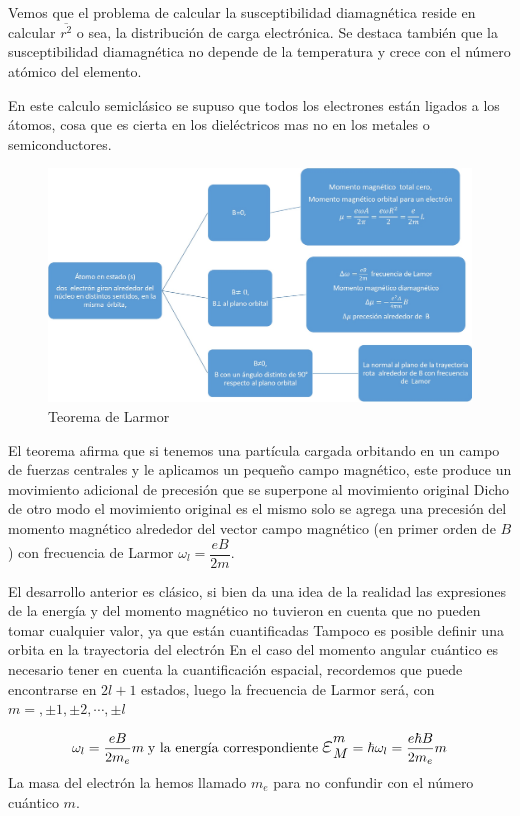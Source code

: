 Vemos que el problema de calcular la susceptibilidad diamagnética reside en calcular $\overline{r^{2}}$ o sea, la distribución de carga electrónica. Se destaca también que la susceptibilidad diamagnética no depende de la temperatura y crece con el número atómico del elemento.

En este calculo semiclásico se supuso que todos los electrones están ligados a los átomos, cosa que es cierta en los dieléctricos mas no en los metales o semiconductores.

\begin{figure}[H]
    \centering
    \includegraphics[width=1.0\textwidth]{./Figures/fig_s11}
	\caption{Teorema de Larmor}
	\label{fig:s11}
\end{figure}

El teorema afirma que si tenemos una partícula cargada orbitando en un campo de fuerzas centrales y le aplicamos un pequeño campo magnético, este produce un movimiento adicional de precesión que se superpone al movimiento original Dicho de otro modo el movimiento original es el mismo solo se agrega una precesión del momento magnético alrededor del vector campo magnético (en primer orden de $B$) con frecuencia de Larmor $\omega_{l}=\dfrac{eB}{2m}$.

El desarrollo anterior es clásico, si bien da una idea de la realidad las expresiones de la energía y del momento magnético no tuvieron en cuenta que no pueden tomar cualquier valor, ya que están cuantificadas Tampoco es posible definir una orbita en la trayectoria del electrón En el caso del momento angular cuántico es necesario tener en cuenta la cuantificación espacial, recordemos que puede encontrarse en $2l+1$ estados, luego la frecuencia de Larmor será, con $m=, \pm 1, \pm 2, \cdots, \pm l$

\begin{equation}
	\omega_{l}= \dfrac{eB}{2m_{e}}m \; \text{y la energía correspondiente} \;\Bb{\varepsilon}_{M}^{m}=\hbar\omega_{l}=\dfrac{e\hbar B}{2m_{e}}m
\end{equation}
La masa del electrón la hemos llamado $m_{e}$ para no confundir con el número cuántico $m$.

